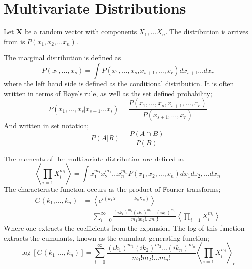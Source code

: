 

 
 \newpage
\section{Multivariate Distributions}

Let $\mathbf{X}$ be a random vector with components $X_1, \dots X_n$. The distribution is arrives from is $P(x_1, x_2, \dots x_n)$. 

The marginal distribution is defined as \[ P(x_1, \dots, x_s) = \int P(x_1, \dots, x_s, x_{s+1}, \dots, x_r)dx_{s+1} \dots dx_r\]
where the left hand side is defined as the conditional distribution. It is often written in terms of Baye's rule, as well as the set defined probability;
\begin{equation}
	 P(x_1, \dots, x_s | x_{s+1} \dots x_r) = \frac{P(x_1, \dots, x_s, x_{s+1}, \dots, x_r)}{P(x_{s+1}, \dots, x_r)}
\end{equation}
And written in set notation;
\begin{equation}
	P(A|B) = \frac{P(A\cap B)}{P(B)}
\end{equation}

The moments of the multivariate distribution are defined as \[\left\langle \prod_{i=1}X^{m_i}_i \right \rangle = \int x_1^{m_1}x_2^{m_1}\dots x_n^{m_n}P(x_1, x_2, \dots, x_n) dx_1 dx_2, \dots dx_n \]
The characteristic function occurs as the product of Fourier transforms;
\begin{align*}
	G(k_1, \dots, k_n) &=\left\langle e^{i(k_1X_1 + \dots + k_nX_n)}\right\rangle \\
					   &= \sum_{i=0}^{\infty} \frac{(ik_1)^{m_1} (ik_2)^{m_2}\dots(ik_n)^{m_n}}{m_1 ! m_2 ! \dots m_n!} \left\langle \prod_{i=1}X^{m_i}_i \right \rangle
\end{align*}
Where one extracts the coefficients from the expansion. The log of this function extracts the cumulants, known as the cumulant generating function;
\begin{equation}
	\log[	G(k_1, \dots, k_n)] = \sum_{i=0}^{\infty} \frac{(ik_1)^{m_1} (ik_2)^{m_2}\dots(ik_n)^{m_n}}{m_1 ! m_2 ! \dots m_n!} \left \langle \prod_{i=1}X^{m_i}_i \right \rangle_c 
\end{equation}

